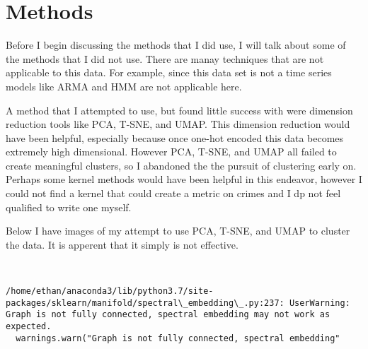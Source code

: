 \documentclass[11pt]{article}
\begin{document}
    \hypertarget{methods}{%
\section{Methods}\label{methods}}

Before I begin discussing the methods that I did use, I will talk about
some of the methods that I did not use. There are manay techniques that
are not applicable to this data. For example, since this data set is not
a time series models like ARMA and HMM are not applicable here.

A method that I attempted to use, but found little success with were
dimension reduction tools like PCA, T-SNE, and UMAP. This dimension
reduction would have been helpful, especially because once one-hot
encoded this data becomes extremely high dimensional. However PCA,
T-SNE, and UMAP all failed to create meaningful clusters, so I abandoned
the the pursuit of clustering early on. Perhaps some kernel methods
would have been helpful in this endeavor, however I could not find a
kernel that could create a metric on crimes and I dp not feel qualified
to write one myself.

Below I have images of my attempt to use PCA, T-SNE, and UMAP to cluster
the data. It is apperent that it simply is not effective.

    \begin{center}
    \end{center}
    { \hspace*{\fill} \\}
    
    \begin{Verbatim}[commandchars=\\\{\}]
/home/ethan/anaconda3/lib/python3.7/site-packages/sklearn/manifold/spectral\_embedding\_.py:237: UserWarning: Graph is not fully connected, spectral embedding may not work as expected.
  warnings.warn("Graph is not fully connected, spectral embedding"

    \end{Verbatim}

    \begin{center}
    \end{center}
    { \hspace*{\fill} \\}
    
\end{document}
